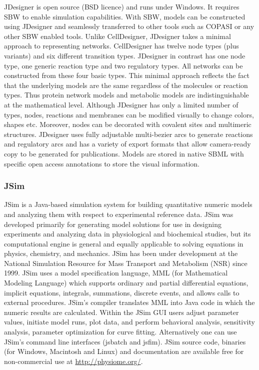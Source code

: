 JDesigner \autocite{BergmannCP:2006} is open
source (BSD licence) and runs under Windows. It requires SBW to enable
simulation capabilities. With SBW, models can be constructed using
JDesigner and seamlessly transferred to other tools such as COPASI or
any other SBW enabled tools. Unlike CellDesigner, JDesigner takes a
minimal approach to representing networks. CellDesigner has twelve node
types (plus variants) and six different transition types. JDesigner in
contrast has one node type, one generic reaction type and two regulatory
types. All networks can be constructed from these four basic types. This
minimal approach reflects the fact that the underlying models are the
same regardless of the molecules or reaction types. Thus protein network
models and metabolic models are indistinguishable at the mathematical
level. Although JDesigner has only a limited number of types, nodes,
reactions and membranes can be modified visually to change colors,
shapes etc. Moreover, nodes can be decorated with covalent sites and
multimeric structures. JDesigner uses fully adjustable multi-bezier arcs
to generate reactions and regulatory arcs and has a variety of export
formats that allow camera-ready copy to be generated for publications.
Models are stored in
native SBML with specific open access annotations to store the visual
information.

\subsubsection{JSim \label{jsim}}

JSim \autocite{raymond03} is a Java-based simulation system for building
quantitative numeric models and analyzing them with respect to
experimental reference data. JSim was developed primarily for generating
model solutions for use in designing experiments and analyzing data in
physiological and biochemical studies, but its computational engine is
general and equally applicable to solving equations in physics,
chemistry, and mechanics. JSim has been under development at the
National Simulation Resource for Mass Transport and Metabolism (NSR)
since 1999. JSim uses a model specification language, MML (for
Mathematical Modeling Language) which supports ordinary and partial
differential equations, implicit equations, integrals, summations,
discrete events, and allows calls to external procedures. JSim's
compiler translates MML into Java code in which the numeric results are
calculated. Within the JSim GUI users adjust parameter values, initiate
model runs, plot data, and perform behavioral analysis, sensitivity
analysis, parameter optimization for curve fitting. Alternatively one
can use JSim's command line interfaces (jsbatch and jsfim). JSim source
code, binaries (for Windows, Macintosh and Linux) and documentation are
available free for non-commercial use at \url{http://physiome.org/}.

